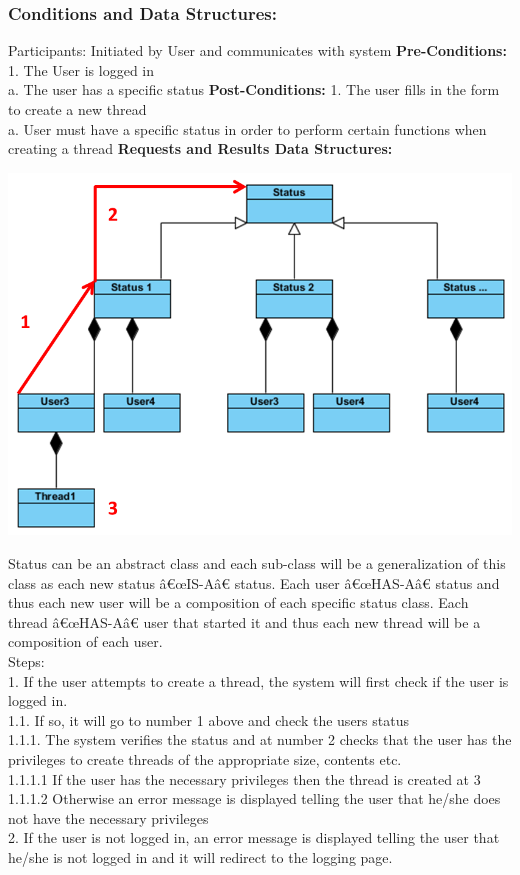 \documentclass[a4paper,11pt]{article}
\begin{document}
\subsubsection{Conditions and Data Structures:}
Participants:
Initiated by User and communicates with system
\textbf{Pre-Conditions:}
1.	The User is logged in \\
a.	The user has a specific status
\textbf{Post-Conditions:}
1.	The user fills in the form to create a new thread\\
a.	User must have a specific status in order to perform certain functions when creating a thread
\textbf{Requests and Results Data Structures:}
\begin{center}
\includegraphics[width=1\linewidth]{./Images/CRUDThread/Diagrams/1.png}
\end{center}
Status can be an abstract class and each sub-class will be a generalization of this class as each new status â€œIS-Aâ€ status.
Each user â€œHAS-Aâ€ status and thus each new user will be a composition of each specific status class.
Each thread â€œHAS-Aâ€ user that started it and thus each new thread will be a composition of each user.\\
Steps:\\
1.	If the user attempts to create a thread, the system will first check if the user is logged in.\\
1.1.	If so, it will go to number 1 above and check the users status\\
1.1.1.	The system verifies the status and at number 2 checks that the user has the privileges to create threads of the appropriate size, contents etc.\\
1.1.1.1	If the user has the necessary privileges then the thread is created at 3\\
1.1.1.2	Otherwise an error message is displayed telling the user that he/she does not have the necessary privileges \\
2.	If the user is not logged in, an error message is displayed telling the user that he/she is not logged in and it will redirect to the logging page.\\
\end{document}
